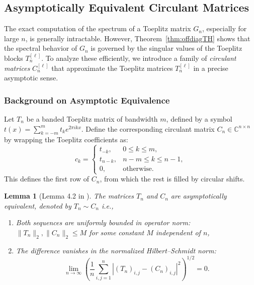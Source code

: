 \documentclass{article}
\newtheorem{lemma}[theorem]{Lemma}
\begin{document}
\subsection{Asymptotically Equivalent Circulant Matrices}\label{sec:circulant}

The exact computation of the spectrum of a Toeplitz matrix \( G_n \), especially for large \( n \), is generally intractable. However, Theorem~\ref{thm:offdiagTH} shows that the spectral behavior of \( G_n \) is governed by the singular values of the Toeplitz blocks \( T_n^{[\ell]} \). To analyze these efficiently, we introduce a family of \emph{circulant matrices} \( C_n^{[\ell]} \) that approximate the Toeplitz matrices \( T_n^{[\ell]} \) in a precise asymptotic sense.

\subsubsection{Background on Asymptotic Equivalence}



Let \( T_n \) be a banded Toeplitz matrix of bandwidth \( m \), defined by a symbol \( t(x) = \sum_{k=-m}^{m} t_k e^{2\pi i k x} \). Define the corresponding circulant matrix \( C_n \in \mathbb{C}^{n \times n} \) by wrapping the Toeplitz coefficients as:
\[
c_k = 
\begin{cases}
t_{-k}, & 0 \leq k \leq m, \\
t_{n-k}, & n-m \leq k \leq n-1, \\
0, & \text{otherwise}.
\end{cases}
\]
This defines the first row of \( C_n \), from which the rest is filled by circular shifts.

\begin{lemma}[Lemma 4.2 in \cite{gray2006toeplitz}]\label{lem:circeigconv} The matrices $T_n$ and $C_n$ are asymptotically equivalent, denoted by $T_n\sim C_n$ i.e.,
\begin{enumerate}
    \item Both sequences are uniformly bounded in operator norm: \( \|T_n\|_2, \|C_n\|_2 \leq M \) for some constant \( M \) independent of \( n \),
    \item The difference vanishes in the normalized Hilbert–Schmidt norm:
    \[
    \lim_{n \to \infty} \left( \frac{1}{n} \sum_{i,j=1}^n |(T_n)_{i,j} - (C_n)_{i,j}|^2 \right)^{1/2} = 0.
    \]
\end{enumerate}
    
\end{lemma}
\end{document}
